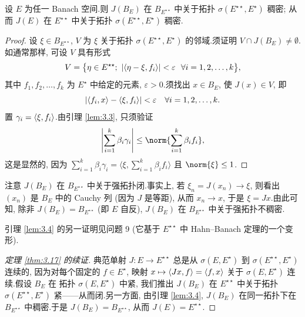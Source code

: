 \begin{lemma}[Goldstine]
\label{lem:3.4}
设 $E$ 为任一 Banach 空间.则 $J(B_E)$ 在 $B_{E^{\star\star}}$ 中关于拓扑
$\sigma(E^{\star\star},E^\star)$ 稠密; 从而 $J(E)$ 在 $E^{\star\star}$ 中关于拓扑
$\sigma(E^{\star\star},E^\star)$ 稠密.
\end{lemma}

\begin{proof}
设 $\xi\in B_{E^{\star\star}}$, $V$ 为 $\xi$ 关于拓扑
$\sigma(E^{\star\star},E^\star)$ 的邻域.须证明
$V\cap J(B_E)\ne\emptyset$.如通常那样, 可设 $V$ 具有形式
\begin{equation*}
V=\bigl\{\eta\in E^{\star\star};\ \abs{\dual{\eta-\xi}{f_i}}<\varepsilon
\ \ \forall i=1,2,\dots,k\bigr\},
\end{equation*}
其中 $f_1,f_2,\dots,f_k$ 为 $E^\star$ 中给定的元素, $\varepsilon>0$.须找出
$x\in B_E$, 使 $J(x)\in V$, 即
\begin{equation*}
\left|\left\langle f_i,x\right\rangle-\left\langle \xi,f_i\right\rangle\right|<\varepsilon\quad\forall i=1,2,\dots,k.
\end{equation*}
置 $\gamma_i=\left\langle \xi,f_i\right\rangle$.由引理  \ref{lem:3.3}, 只须验证
\begin{equation*}
\abs{\sum_{i=1}^k\beta_i\gamma_i}\le\norm{\sum_{i=1}^k\beta_i f_i},
\end{equation*}
这是显然的, 因为
$\sum_{i=1}^k\beta_i\gamma_i=\bigl\langle\xi,\sum_{i=1}^k\beta_i f_i\bigr\rangle$
且 $\norm{\xi}\le1$.
\end{proof}

\begin{remark}
\label{rem:3.15}
注意 $J(B_E)$ 在 $B_{E^{\star\star}}$ 中关于强拓扑闭.事实上, 若
$\xi_n=J(x_n)\to\xi$, 则看出 $(x_n)$ 是 $B_E$ 中的 Cauchy 列 (因为 $J$ 是等距),
从而 $x_n\to x$, 于是 $\xi=Jx$.由此可知, 除非 $J(B_E)=B_{E^{\star\star}}$
(即 $E$ 自反), $J(B_E)$ 在 $B_{E^{\star\star}}$ 中关于强拓扑不稠密.
\end{remark}

\begin{remark}
\label{rem:3.16}
引理  \ref{lem:3.4} 的另一证明见问题 9 (它基于 $E^{\star\star}$ 中 Hahn--Banach
定理的一个变形).
\end{remark}

\begin{proof}[定理 \ref{thm:3.17} 的续证]
典范单射 $J:E\to E^{\star\star}$ 总是从 $\sigma(E,E^\star)$ 到
$\sigma(E^{\star\star},E^\star)$ 连续的, 因为对每个固定的 $f\in E^\star$, 映射
$x\mapsto\left\langle Jx,f\right\rangle=\left\langle f,x\right\rangle$ 关于 $\sigma(E,E^\star)$ 连续.假设 $B_E$ 在
拓扑 $\sigma(E,E^\star)$ 中紧, 我们推出 $J(B_E)$ 在 $E^{\star\star}$ 中关于拓扑
$\sigma(E^{\star\star},E^\star)$ 紧——从而闭.另一方面, 由引理  \ref{lem:3.4},
$J(B_E)$ 在同一拓扑下在 $B_{E^{\star\star}}$ 中稠密.于是
$J(B_E)=B_{E^{\star\star}}$, 从而 $J(E)=E^{\star\star}$.
\end{proof}

